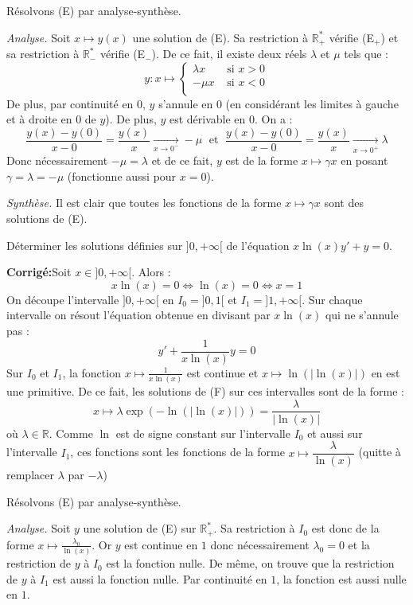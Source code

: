 \documentclass[a4paper,twoside,french,11pt]{VcCours}
\newcommand{\corr}{\textbf{Corrigé:}}
\begin{document}
Résolvons (E) par analyse-synthèse.


\textit{Analyse.} Soit $x \mapsto y(x)$ une solution de (E). Sa restriction à $\mathbb R_+^*$ vérifie (E$_+$) et sa restriction à $\mathbb R_-^*$ vérifie (E$_-$). De ce fait, il existe deux réels $\lambda$ et $\mu$ tels que :
$$y : x\mapsto \left\{\begin{array}{ll} \lambda x & \text{ si } x > 0 \\-\mu x & \text{ si } x < 0 \\ \end{array}\right.$$
De plus, par continuité en $0$, $y$ s'annule en $0$ (en considérant les limites à gauche et à droite en $0$ de $y$).
De plus, $y$ est dérivable en $0$. On a :
$$\dfrac{y(x)-y(0)}{x-0} = \dfrac{y(x)}{x} \underset{x\to0^-}{\longrightarrow} -\mu \; \text{ et } \; \dfrac{y(x)-y(0)}{x-0} = \dfrac{y(x)}{x} \underset{x\to0^+}{\longrightarrow} \lambda $$
Donc nécessairement $-\mu = \lambda $ et de ce fait, $y$ est de la forme $x \mapsto \gamma x$ en posant $\gamma = \lambda  = -\mu$ (fonctionne aussi pour $x=0$).


\textit{Synthèse.} Il est clair que toutes les fonctions de la forme $x \mapsto \gamma x$ sont des solutions de (E). 

\begin{Exercice}{} Déterminer les solutions définies sur $]0,+\infty[$ de l'équation 
$ x \ln(x)y'+ y = 0$.
\end{Exercice}

\corr Soit $x \in ]0,+\infty[$. Alors :
$$x \ln(x) = 0 \iff \ln(x) = 0 \iff x = 1$$
On découpe l'intervalle $]0,+\infty[$ en $I_0 = ]0,1[$ et $I_1 = ]1,+\infty[$. Sur chaque intervalle on résout l'équation obtenue en divisant par $x\ln(x)$ qui ne s'annule pas :
\begin{equation}
\tag{F}
y' + \dfrac{1}{x\ln (x)} y= 0
\end{equation}
Sur $I_0$ et $I_1$, la fonction $x \mapsto \frac{1}{x\ln(x)}$ est continue et $x \mapsto \ln(|\ln (x)|)$ en est une primitive. De ce fait, les solutions de (F) sur ces intervalles sont de la forme :
$$x \mapsto \lambda \exp(-\ln(|\ln (x)|)) = \frac{\lambda}{|\ln (x)|}$$
où $\lambda \in \mathbb{R}$. Comme $\ln$ est de signe constant sur l'intervalle $I_0$ et aussi sur l'intervalle $I_1$, ces fonctions sont les fonctions de la forme $x \mapsto \dfrac{\lambda}{\ln (x)}$ (quitte à remplacer $\lambda$ par $-\lambda$)


Résolvons (E) par analyse-synthèse.


\textit{Analyse.} Soit $y$ une solution de (E) sur $\mathbb R_+^*$. Sa restriction à $I_0$ est donc de la forme $x \mapsto \frac{\lambda_0}{\ln (x)}$. Or $y$ est continue en $1$ donc nécessairement $\lambda_0 = 0$ et la restriction de $y$ à $I_0$ est la fonction nulle. De même, on trouve que la restriction de $y$ à $I_1$ est aussi la fonction nulle. Par continuité en $1$, la fonction est aussi nulle en $1$.
\end{document}
